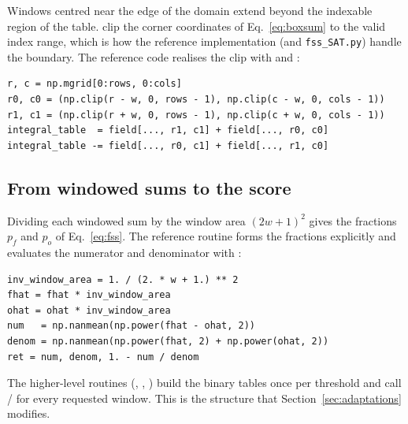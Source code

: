 Windows centred near the edge of the domain extend beyond the indexable region
of the table. \citet{faggian2015} clip the corner coordinates of
Eq.~\eqref{eq:boxsum} to the valid index range, which is how the reference
implementation (and \texttt{fss\_SAT.py}) handle the boundary. The reference
code realises the clip with  and :

{\begin{lstlisting}[style=python]
r, c = np.mgrid[0:rows, 0:cols]
r0, c0 = (np.clip(r - w, 0, rows - 1), np.clip(c - w, 0, cols - 1))
r1, c1 = (np.clip(r + w, 0, rows - 1), np.clip(c + w, 0, cols - 1))
integral_table  = field[..., r1, c1] + field[..., r0, c0]
integral_table -= field[..., r0, c1] + field[..., r1, c0]
\end{lstlisting}}

\subsection{From windowed sums to the score}

Dividing each windowed sum by the window area $(2w+1)^2$ gives the fractions
$p_f$ and $p_o$ of Eq.~\eqref{eq:fss}. The reference  routine
forms the fractions explicitly and evaluates the numerator and denominator with
:

{\begin{lstlisting}[style=python]
inv_window_area = 1. / (2. * w + 1.) ** 2
fhat = fhat * inv_window_area
ohat = ohat * inv_window_area
num   = np.nanmean(np.power(fhat - ohat, 2))
denom = np.nanmean(np.power(fhat, 2) + np.power(ohat, 2))
ret = num, denom, 1. - num / denom
\end{lstlisting}}

The higher-level routines (, ,
) build the binary tables once per threshold and call
/ for every requested window. This is
the structure that Section~\ref{sec:adaptations} modifies.
